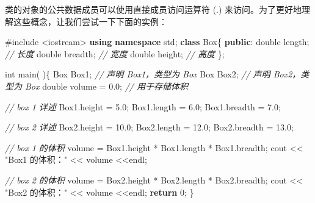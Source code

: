 \documentclass[
]{article}
\newenvironment{Shaded}{}{}
\newcommand{\CommentTok}[1]{\textcolor[rgb]{0.38,0.63,0.69}{\textit{#1}}}
\newcommand{\ControlFlowTok}[1]{\textcolor[rgb]{0.00,0.44,0.13}{\textbf{#1}}}
\newcommand{\DataTypeTok}[1]{\textcolor[rgb]{0.56,0.13,0.00}{#1}}
\newcommand{\DecValTok}[1]{\textcolor[rgb]{0.25,0.63,0.44}{#1}}
\newcommand{\FloatTok}[1]{\textcolor[rgb]{0.25,0.63,0.44}{#1}}
\newcommand{\ImportTok}[1]{#1}
\newcommand{\KeywordTok}[1]{\textcolor[rgb]{0.00,0.44,0.13}{\textbf{#1}}}
\newcommand{\NormalTok}[1]{#1}
\newcommand{\OperatorTok}[1]{\textcolor[rgb]{0.40,0.40,0.40}{#1}}
\newcommand{\PreprocessorTok}[1]{\textcolor[rgb]{0.74,0.48,0.00}{#1}}
\newcommand{\StringTok}[1]{\textcolor[rgb]{0.25,0.44,0.63}{#1}}
\begin{document}
类的对象的公共数据成员可以使用直接成员访问运算符 (.)
来访问。为了更好地理解这些概念，让我们尝试一下下面的实例：

\begin{Shaded}
\begin{Highlighting}[]
\PreprocessorTok{\#include }\ImportTok{\textless{}iostream\textgreater{}}
\KeywordTok{using} \KeywordTok{namespace}\NormalTok{ std}\OperatorTok{;}
\KeywordTok{class}\NormalTok{ Box}\OperatorTok{\{}
\KeywordTok{public}\OperatorTok{:}
   \DataTypeTok{double}\NormalTok{ length}\OperatorTok{;}   \CommentTok{// 长度}
   \DataTypeTok{double}\NormalTok{ breadth}\OperatorTok{;}  \CommentTok{// 宽度}
   \DataTypeTok{double}\NormalTok{ height}\OperatorTok{;}   \CommentTok{// 高度}
\OperatorTok{\};}

\DataTypeTok{int}\NormalTok{ main}\OperatorTok{(} \OperatorTok{)\{}
\NormalTok{   Box Box1}\OperatorTok{;}        \CommentTok{// 声明 Box1，类型为 Box}
\NormalTok{   Box Box2}\OperatorTok{;}        \CommentTok{// 声明 Box2，类型为 Box}
   \DataTypeTok{double}\NormalTok{ volume }\OperatorTok{=} \FloatTok{0.0}\OperatorTok{;}     \CommentTok{// 用于存储体积}
 
   \CommentTok{// box 1 详述}
\NormalTok{   Box1}\OperatorTok{.}\NormalTok{height }\OperatorTok{=} \FloatTok{5.0}\OperatorTok{;} 
\NormalTok{   Box1}\OperatorTok{.}\NormalTok{length }\OperatorTok{=} \FloatTok{6.0}\OperatorTok{;} 
\NormalTok{   Box1}\OperatorTok{.}\NormalTok{breadth }\OperatorTok{=} \FloatTok{7.0}\OperatorTok{;}

   \CommentTok{// box 2 详述}
\NormalTok{   Box2}\OperatorTok{.}\NormalTok{height }\OperatorTok{=} \FloatTok{10.0}\OperatorTok{;}
\NormalTok{   Box2}\OperatorTok{.}\NormalTok{length }\OperatorTok{=} \FloatTok{12.0}\OperatorTok{;}
\NormalTok{   Box2}\OperatorTok{.}\NormalTok{breadth }\OperatorTok{=} \FloatTok{13.0}\OperatorTok{;}

   \CommentTok{// box 1 的体积}
\NormalTok{   volume }\OperatorTok{=}\NormalTok{ Box1}\OperatorTok{.}\NormalTok{height }\OperatorTok{*}\NormalTok{ Box1}\OperatorTok{.}\NormalTok{length }\OperatorTok{*}\NormalTok{ Box1}\OperatorTok{.}\NormalTok{breadth}\OperatorTok{;}
\NormalTok{   cout }\OperatorTok{\textless{}\textless{}} \StringTok{"Box1 的体积："} \OperatorTok{\textless{}\textless{}}\NormalTok{ volume }\OperatorTok{\textless{}\textless{}}\NormalTok{endl}\OperatorTok{;}

   \CommentTok{// box 2 的体积}
\NormalTok{   volume }\OperatorTok{=}\NormalTok{ Box2}\OperatorTok{.}\NormalTok{height }\OperatorTok{*}\NormalTok{ Box2}\OperatorTok{.}\NormalTok{length }\OperatorTok{*}\NormalTok{ Box2}\OperatorTok{.}\NormalTok{breadth}\OperatorTok{;}
\NormalTok{   cout }\OperatorTok{\textless{}\textless{}} \StringTok{"Box2 的体积："} \OperatorTok{\textless{}\textless{}}\NormalTok{ volume }\OperatorTok{\textless{}\textless{}}\NormalTok{endl}\OperatorTok{;}
   \ControlFlowTok{return} \DecValTok{0}\OperatorTok{;}
\OperatorTok{\}}
\end{Highlighting}
\end{Shaded}
\end{document}
